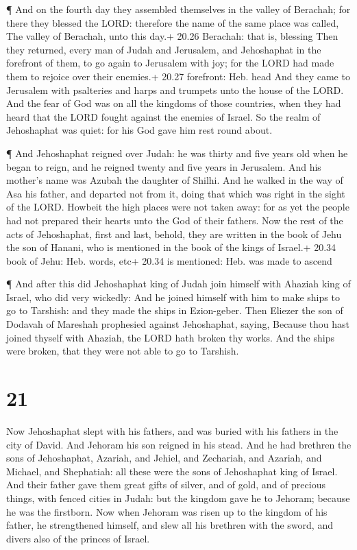  ¶ And on the fourth day they assembled themselves in the
valley of Berachah; for there they blessed the LORD: therefore the name
of the same place was called, The valley of Berachah, unto this day.+
20.26 Berachah: that is, blessing  Then they returned,
every man of Judah and Jerusalem, and Jehoshaphat in the forefront of
them, to go again to Jerusalem with joy; for the LORD had made them to
rejoice over their enemies.+ 20.27 forefront: Heb. head 
And they came to Jerusalem with psalteries and harps and trumpets unto
the house of the LORD.  And the fear of God was on all the
kingdoms of those countries, when they had heard that the LORD fought
against the enemies of Israel.  So the realm of Jehoshaphat
was quiet: for his God gave him rest round about.

 ¶ And Jehoshaphat reigned over Judah: he was thirty and
five years old when he began to reign, and he reigned twenty and five
years in Jerusalem. And his mother's name was Azubah the daughter of
Shilhi.  And he walked in the way of Asa his father, and
departed not from it, doing that which was right in the sight of the
LORD.  Howbeit the high places were not taken away: for as
yet the people had not prepared their hearts unto the God of their
fathers.  Now the rest of the acts of Jehoshaphat, first
and last, behold, they are written in the book of Jehu the son of
Hanani, who is mentioned in the book of the kings of Israel.+ 20.34 book
of Jehu: Heb. words, etc+ 20.34 is mentioned: Heb. was made to ascend

 ¶ And after this did Jehoshaphat king of Judah join
himself with Ahaziah king of Israel, who did very wickedly:
 And he joined himself with him to make ships to go to
Tarshish: and they made the ships in Ezion-geber.  Then
Eliezer the son of Dodavah of Mareshah prophesied against Jehoshaphat,
saying, Because thou hast joined thyself with Ahaziah, the LORD hath
broken thy works. And the ships were broken, that they were not able to
go to Tarshish.

\hypertarget{section-20}{%
\section{21}\label{section-20}}

 Now Jehoshaphat slept with his fathers, and was buried with
his fathers in the city of David. And Jehoram his son reigned in his
stead.  And he had brethren the sons of Jehoshaphat,
Azariah, and Jehiel, and Zechariah, and Azariah, and Michael, and
Shephatiah: all these were the sons of Jehoshaphat king of Israel.
 And their father gave them great gifts of silver, and of
gold, and of precious things, with fenced cities in Judah: but the
kingdom gave he to Jehoram; because he was the firstborn. 
Now when Jehoram was risen up to the kingdom of his father, he
strengthened himself, and slew all his brethren with the sword, and
divers also of the princes of Israel.

